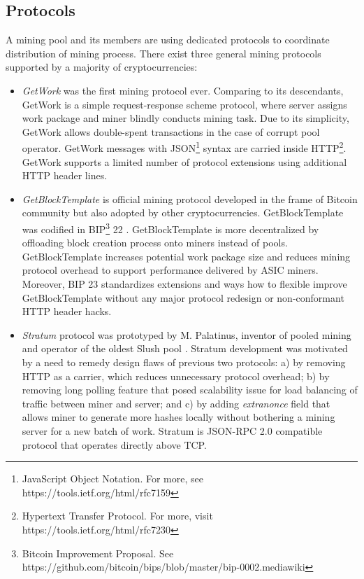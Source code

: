 \documentclass[preprint,12pt,3p]{elsarticle}
\begin{document}
\subsection{Protocols}
\label{subsec33}
A mining pool and its members are using dedicated protocols to coordinate distribution of mining process. There exist three general mining protocols supported by a majority of cryptocurrencies: 

\begin{itemize}
    \item\textit{GetWork} was the first mining protocol ever. Comparing to its descendants, GetWork is a simple request-response scheme protocol, where server assigns work package and miner blindly conducts mining task. Due to its simplicity, GetWork allows double-spent transactions in the case of corrupt pool operator. GetWork messages with JSON\footnote{JavaScript Object Notation. For more, see https://tools.ietf.org/html/rfc7159} syntax are carried inside  HTTP\footnote{Hypertext Transfer Protocol. For more, visit https://tools.ietf.org/html/rfc7230}. GetWork supports a limited number of protocol extensions using additional HTTP header lines.
    \item\textit{GetBlockTemplate} is official mining protocol developed in the frame of Bitcoin community but also adopted by other cryptocurrencies. GetBlockTemplate was codified in BIP\footnote{Bitcoin Improvement Proposal. See https://github.com/bitcoin/bips/blob/master/bip-0002.mediawiki} 22 \cite{BIP22}. GetBlockTemplate is more decentralized by offloading block creation process onto miners instead of pools. GetBlockTemplate increases potential work package size and reduces mining protocol overhead to support performance delivered by ASIC miners. Moreover, BIP 23 \cite{BIP23} standardizes extensions and ways how to flexible improve GetBlockTemplate without any major protocol redesign or non-conformant HTTP header hacks.
    \item\textit{Stratum} protocol \cite{SLUSHSTRATUM} was prototyped by M. Palatinus, inventor of pooled mining and operator of the oldest Slush pool \cite{SLUSHPOOL}. Stratum development was motivated by a need to remedy design flaws of previous two protocols: a) by removing HTTP as a carrier, which reduces unnecessary protocol overhead; b) by removing long polling feature that posed scalability issue for load balancing of traffic between miner and server; and c) by adding \textit{extranonce} field that allows miner to generate more hashes locally without bothering a mining server for a new batch of work. Stratum is JSON-RPC 2.0 \cite{JSONRPC} compatible protocol that operates directly above TCP.
\end{itemize}
\end{document}

